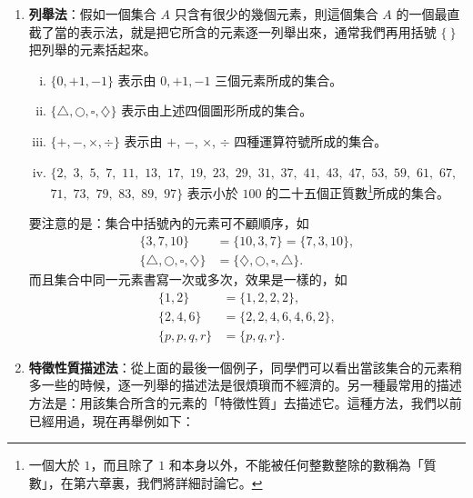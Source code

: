 \begin{enumerate}[(一)]
  \item \textbf{列舉法}：假如一個集合 $A$ 只含有很少的幾個元素，則這個集合 $A$ 的一個最直截了當的表示法，就是把它所含的元素逐一列舉出來，通常我們再用括號 $\{\ \}$ 把列舉的元素括起來。
  
  \begin{example}\label{ex:2-3-1}
  \begin{enumerate}[(i)]
    \item $\{0, +1, -1\}$ 表示由 $0, +1, -1$ 三個元素所成的集合。
    \item $\{\triangle, \bigcirc, \square, \diamondsuit\}$ 表示由上述四個圖形所成的集合。
    \item $\{+, -, \times, \div\}$ 表示由 $+$, $-$, $\times$, $\div$ 四種運算符號所成的集合。
    \item $\{2,$ $3,$ $5,$ $7,$ $11,$ $13,$ $17,$ $19,$ $23,$ $29,$ $31,$ $37,$ $41,$ $43,$ $47,$ $53,$ $59,$ $61,$ $67,$ $71,$ $73,$ $79,$ $83,$ $89,$ $97\}$ 表示小於 $100$ 的二十五個正質數\footnote{\label{fn:prime}一個大於 $1$，而且除了 $1$ 和本身以外，不能被任何整數整除的數稱為「質數」，在第六章裏，我們將詳細討論它。}所成的集合。
  \end{enumerate}
  要注意的是：集合中括號內的元素可不顧順序，如
  \begin{align*}
    \{3, 7, 10\} &= \{10, 3, 7\} = \{7, 3, 10\}, \\
    \{\triangle, \bigcirc, \square, \diamondsuit\} &= \{\diamondsuit, \bigcirc, \square, \triangle\}.
  \end{align*}
  而且集合中同一元素書寫一次或多次，效果是一樣的，如
  \begin{align*}
    \{1, 2\} &= \{1, 2, 2, 2\}, \\
    \{2, 4, 6\} &= \{2, 2, 4, 6, 4, 6, 2\}, \\
    \{p, p, q, r\} &= \{p, q, r\}.
  \end{align*}
  \end{example}

  \item \textbf{特徵性質描述法}：從上面的最後一個例子，同學們可以看出當該集合的元素稍多一些的時候，逐一列舉的描述法是很煩瑣而不經濟的。另一種最常用的描述方法是：用該集合所含的元素的「特徵性質」去描述它。這種方法，我們以前已經用過，現在再舉例如下：
  

\end{enumerate}
